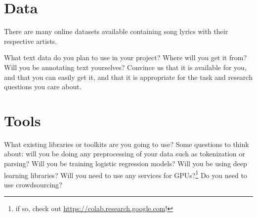 \documentclass[11pt,a4paper]{article}
\begin{document}
\section{Data}
There are many online datasets available containing song lyrics with their respective artists.

What text data do you plan to use in your project? Where will you get it from? Will you be annotating text yourselves? Convince us that it is available for you, and that you can easily get it, and that it is appropriate for the task and research questions you care about.

\section{Tools}
What existing libraries or toolkits are you going to use? 
Some questions to think about: will you be doing any preprocessing of your data such as tokenization or parsing? 
Will you be training logistic regression models? Will you be using deep learning libraries? 
Will you need to use any services for GPUs?\footnote{if so, check out \url{https://colab.research.google.com}!} 
Do you need to use crowdsourcing?


\footnotesize

\end{document}
